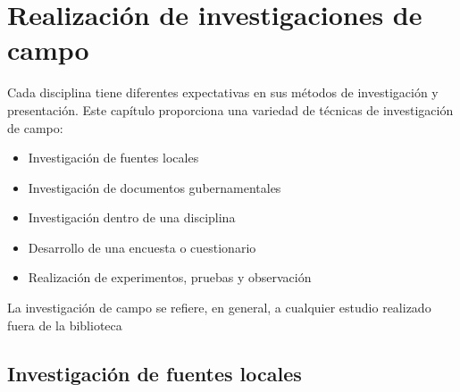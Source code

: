 \chapter{Realización de investigaciones de campo}
Cada disciplina tiene diferentes expectativas en sus métodos de investigación y presentación. Este capítulo proporciona una variedad de técnicas de investigación de campo: 

\begin{itemize}
    \item Investigación de fuentes locales 
    \item Investigación de documentos gubernamentales  
    \item Investigación dentro de una disciplina 
    \item Desarrollo de una encuesta o cuestionario 
    \item Realización de experimentos, pruebas y observación
\end{itemize}

La investigación de campo se refiere, en general, a cualquier estudio realizado fuera de la biblioteca\\

\section{Investigación de fuentes locales}

